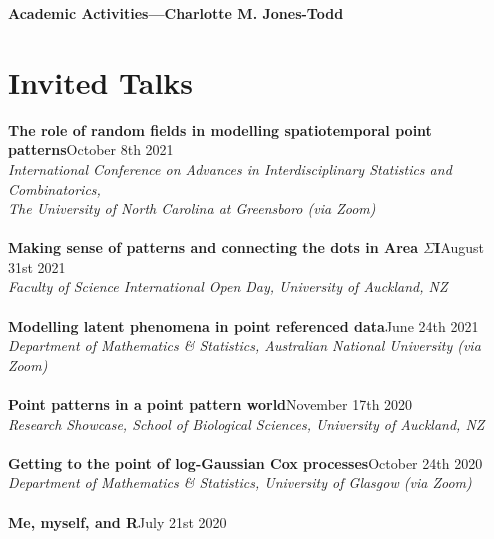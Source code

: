 \documentclass[10pt,letter]{article}
\begin{document}
\LARGE{\textbf{Academic Activities---Charlotte M. Jones-Todd}}

\normalsize

\noindent\makebox[\linewidth]{\rule{\paperwidth}{0.4pt}}

\section*{Invited Talks}
\vspace{1mm}
{\textbf{The role of random fields in modelling spatiotemporal point patterns}}\hfill October 8th 2021\\
       {\sl International Conference on Advances in Interdisciplinary Statistics and Combinatorics,\\ The University of North Carolina at Greensboro (via Zoom)}\\
       \hdashrule[0.5ex]{4cm}{1pt}{1pt}\\
 {\textbf{Making sense of patterns and connecting the dots in Area $\Sigma$I}}\hfill August 31st 2021\\
       {\sl Faculty of Science International Open Day, University of Auckland, NZ}\\
       \hdashrule[0.5ex]{4cm}{1pt}{1pt}\\
       {\textbf{Modelling latent phenomena in point referenced data}}\hfill June 24th 2021\\
       {\sl Department of Mathematics \& Statistics, Australian National University (via Zoom)}\\
       \hdashrule[0.5ex]{4cm}{1pt}{1pt}\\
                 {\textbf{Point patterns in a point pattern world}}\hfill November 17th 2020\\
                 {\sl Research Showcase, School of Biological Sciences, University of Auckland, NZ}\\
                 \hdashrule[0.5ex]{4cm}{1pt}{1pt}\\
                           {\textbf{Getting to the point of log-Gaussian Cox processes}}\hfill October 24th 2020\\
                           {\sl Department of Mathematics \& Statistics, University of Glasgow (via Zoom)}\\
                           \hdashrule[0.5ex]{4cm}{1pt}{1pt}\\
                                     {\textbf{Me, myself, and R}}\hfill July 21st 2020\\
\end{document}
